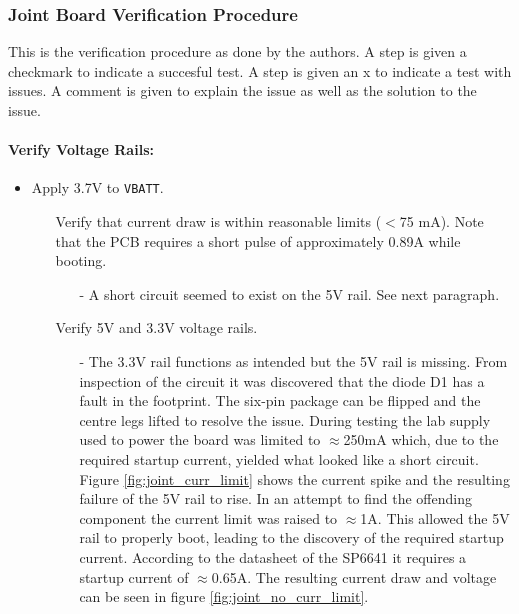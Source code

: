 \subsubsection{Joint Board Verification Procedure} %
\label{ssub:joint_board_verification_methodology}
This is the verification procedure as done by the authors.
A step is given a checkmark to indicate a succesful test.
A step is given an x to indicate a test with issues.
A comment is given to explain the issue as well as the solution to the issue.
\paragraph{Verify Voltage Rails:} %
 \label{par:verify_voltage_rails}
 \begin{itemize}
 	\item Apply 3.7V to \texttt{VBATT}.
 	\begin{itemize}
 		\item[\xmark] Verify that current draw is within reasonable limits ($<$75 mA). Note that the PCB requires a short pulse of approximately 0.89A while booting.
 		\begin{itemize}
 			\item[-] A short circuit seemed to exist on the 5V rail.
 			See next paragraph.
 		\end{itemize}
 		\item[\xmark] Verify 5V and 3.3V voltage rails.
 		\begin{itemize}
 			\item[-] The 3.3V rail functions as intended but the 5V rail is missing.
 			From inspection of the circuit it was discovered that the diode D1 has a fault in the footprint.
 			The six-pin package can be flipped and the centre legs lifted to resolve the issue.
 			During testing the lab supply used to power the board was limited to $\approx$250mA which, due to the required startup current, yielded what looked like a short circuit.
 			Figure \ref{fig:joint_curr_limit} shows the current spike and the resulting failure of the 5V rail to rise.
 			In an attempt to find the offending component the current limit was raised to $\approx$1A.
 			This allowed the 5V rail to properly boot, leading to the discovery of the required startup current.
 			According to the datasheet of the SP6641 \cite{sp6641b} it requires a startup current of $\approx$0.65A. 
 			The resulting current draw and voltage can be seen in figure \ref{fig:joint_no_curr_limit}.
 		\end{itemize}
 	\end{itemize}
 \end{itemize}
 

